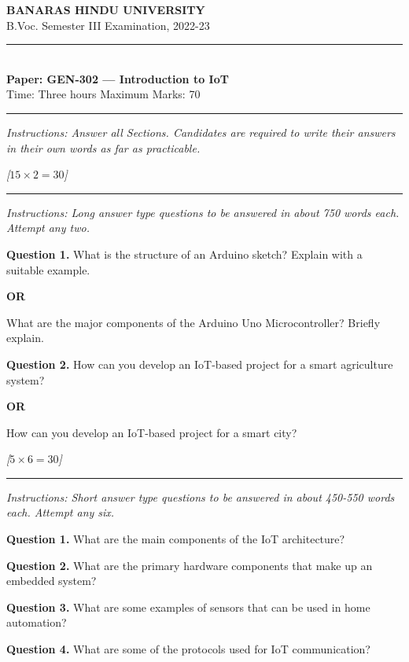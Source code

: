\documentclass[11pt,a4paper]{article}
\newcommand{\pts}[1]{\hfill\textit{[#1]}}
\begin{document}
\begin{center}
  {\large\bfseries BANARAS HINDU UNIVERSITY}\\[2pt]
  {\normalsize B.Voc. Semester III Examination, 2022-23}\\[6pt]
  \rule{0.8\linewidth}{0.5pt}\\[6pt]
  {\large\bfseries Paper: GEN-302 --- Introduction to IoT}\\[4pt]
  {\normalsize Time: Three hours \hfill Maximum Marks: 70}
\end{center}

\rule{\linewidth}{0.4pt}

\smallskip
\noindent\textit{Instructions: Answer all Sections. Candidates are required to write their answers in their own words as far as practicable.}

\bigskip

\bigskip{}\pts{$15 \times 2 = 30$}
\rule{\linewidth}{0.4pt}\smallskip

\noindent\textit{Instructions: Long answer type questions to be answered in about 750 words each. Attempt any two.}

\medskip\noindent\textbf{Question 1.} What is the structure of an Arduino sketch? Explain with a suitable example.
\centerline{\textbf{OR}}
What are the major components of the Arduino Uno Microcontroller? Briefly explain.

\medskip\noindent\textbf{Question 2.} How can you develop an IoT-based project for a smart agriculture system?
\centerline{\textbf{OR}}
How can you develop an IoT-based project for a smart city?

\bigskip{}\pts{$5 \times 6 = 30$}
\rule{\linewidth}{0.4pt}\smallskip

\noindent\textit{Instructions: Short answer type questions to be answered in about 450-550 words each. Attempt any six.}

\medskip\noindent\textbf{Question 1.} What are the main components of the IoT architecture?

\medskip\noindent\textbf{Question 2.} What are the primary hardware components that make up an embedded system?

\medskip\noindent\textbf{Question 3.} What are some examples of sensors that can be used in home automation?

\medskip\noindent\textbf{Question 4.} What are some of the protocols used for IoT communication?
\end{document}
